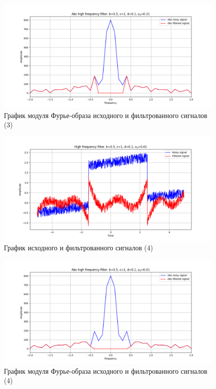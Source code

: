\documentclass[a4paper, 12pt]{article}
\begin{document}
    \begin{figure}[!htb]
        \centering
        \includegraphics[scale=0.48]{3_abs_u_U_nolow.png}
        \captionsetup{skip=0pt}
        \caption{График модуля Фурье-образа исходного и фильтрованного сигналов (3)}
        \label{fig:fig32}
    \end{figure}
    \begin{figure}[!htb]
        \centering
        \includegraphics[scale=0.48]{4_u_flt_u_nolow.png}
        \captionsetup{skip=0pt}
        \caption{График исходного и фильтрованного сигналов (4)}
        \label{fig:fig33}
    \end{figure}
    \begin{figure}[!htb]
        \centering
        \includegraphics[scale=0.48]{4_abs_u_U_nolow.png}
        \captionsetup{skip=0pt}
        \caption{График модуля Фурье-образа исходного и фильтрованного сигналов (4)}
        \label{fig:fig34}
    \end{figure}
\end{document}
